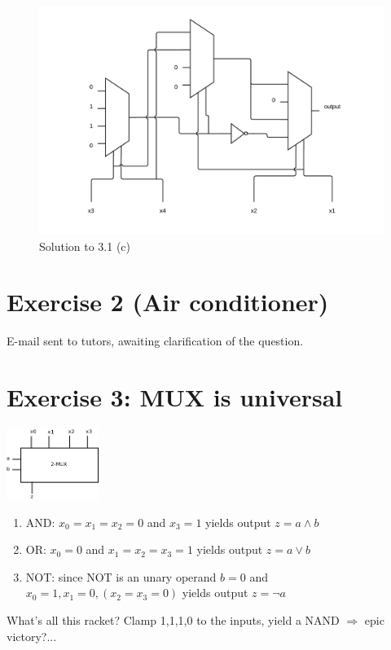 \documentclass[10pt,a4paper]{scrartcl}
\begin{document}
\vspace{1em}
\begin{figure}[h]
  \centering\includegraphics[width=\linewidth]{images/exercise_3_1_c.png}
  \caption{Solution to 3.1 (c)}
\end{figure}
\vspace{1em}

\FloatBarrier
\section*{Exercise 2 (Air conditioner)}
E-mail sent to tutors, awaiting clarification of the question.

\section*{Exercise 3: MUX is universal}

\includegraphics[width=3cm]{images/3-3.png}
\begin{enumerate}
 \item AND: $x_0=x_1=x_2=0$ and $x_3 = 1$ yields output $z = a \land b$
 \item OR: $x_0 = 0$ and $x_1=x_2=x_3= 1$ yields output $z = a \lor b$
 \item NOT: since NOT is an unary operand $b=0$ and $x_0=1, x_1=0, (x_2=x_3=0)$ yields output $z = \lnot a$
\end{enumerate}
What's all this racket? Clamp 1,1,1,0 to the inputs, yield a NAND $\Rightarrow$ epic victory?...
\end{document}
